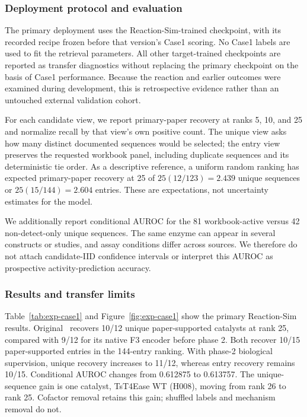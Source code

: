 \subsubsection{Deployment protocol and evaluation}

The primary deployment uses the Reaction-Sim-trained checkpoint, with its
recorded recipe frozen before that version's Case1 scoring. No Case1 labels
are used to fit the retrieval parameters. All other target-trained checkpoints
are reported as transfer diagnostics without replacing the primary checkpoint
on the basis of Case1 performance. Because the reaction and earlier outcomes
were examined during development, this is retrospective evidence rather than
an untouched external validation cohort.

For each candidate view, we report primary-paper recovery at ranks 5, 10,
and 25 and normalize recall by that view's own positive count. The unique
view asks how many distinct documented sequences would be selected; the
entry view preserves the requested workbook panel, including duplicate
sequences and its deterministic tie order. As a descriptive reference, a
uniform random ranking has expected primary-paper recovery at 25 of
$25(12/123)=2.439$ unique sequences or $25(15/144)=2.604$ entries. These are
expectations, not uncertainty estimates for the model.

We additionally report conditional AUROC for the 81 workbook-active versus
42 non-detect-only unique sequences. The same enzyme can appear in several
constructs or studies, and assay conditions differ across sources. We
therefore do not attach candidate-IID confidence intervals or interpret this
AUROC as prospective activity-prediction accuracy.

\subsubsection{Results and transfer limits}

Table~\ref{tab:exp-case1} and Figure~\ref{fig:exp-case1} show the primary
Reaction-Sim results. Original \methodname\ recovers 10/12 unique
paper-supported catalysts at rank 25, compared with 9/12 for its native F3
encoder before phase 2. Both recover 10/15 paper-supported entries in the
144-entry ranking. With phase-2 biological supervision, unique recovery
increases to 11/12, whereas entry recovery remains 10/15. Conditional AUROC
changes from 0.612875 to 0.613757. The unique-sequence gain is one catalyst,
TsT4Ease WT (H008), moving from rank 26 to rank 25. Cofactor removal retains
this gain; shuffled labels and mechanism removal do not.

